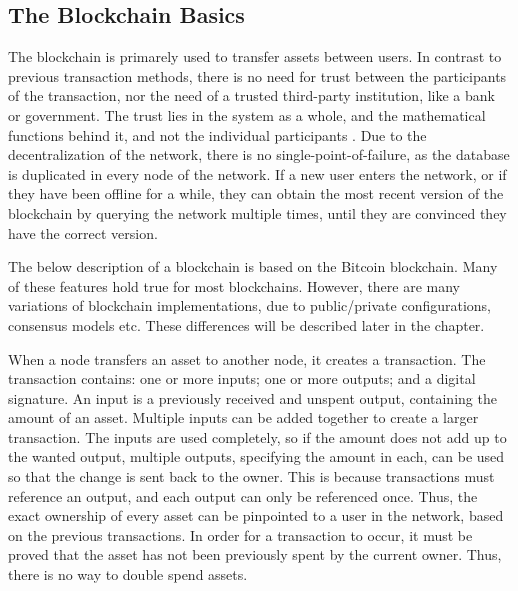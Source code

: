 \subsection{The Blockchain Basics} \label{blockchain_basics}
The blockchain is primarely used to transfer assets between users. In contrast to previous transaction methods, there is no need for trust between the participants of the transaction, nor the need of a trusted third-party institution, like a bank or government. The trust lies in the system as a whole, and the mathematical functions behind it, and not the individual participants \cite{Nofer}. Due to the decentralization of the network, there is no single-point-of-failure, as the database is duplicated in every node of the network. If a new user enters the network, or if they have been offline for a while, they can obtain the most recent version of the blockchain by querying the network multiple times, until they are convinced they have the correct version. %

The below description of a blockchain is based on the Bitcoin blockchain. Many of these features hold true for most blockchains. However, there are many variations of blockchain implementations, due to public/private configurations, consensus models etc. These differences will be described later in the chapter.

When a node transfers an asset to another node, it creates a transaction. The transaction contains: one or more inputs; one or more outputs; and a digital signature. An input is a previously received and unspent output, containing the amount of an asset. Multiple inputs can be added together to create a larger transaction. The inputs are used completely, so if the amount does not add up to the wanted output, multiple outputs, specifying the amount in each, can be used so that the change is sent back to the owner. This is because transactions must reference an output, and each output can only be referenced once. Thus, the exact ownership of every asset can be pinpointed to a user in the network, based on the previous transactions. In order for a transaction to occur, it must be proved that the asset has not been previously spent by the current owner. Thus, there is no way to double spend assets. %


